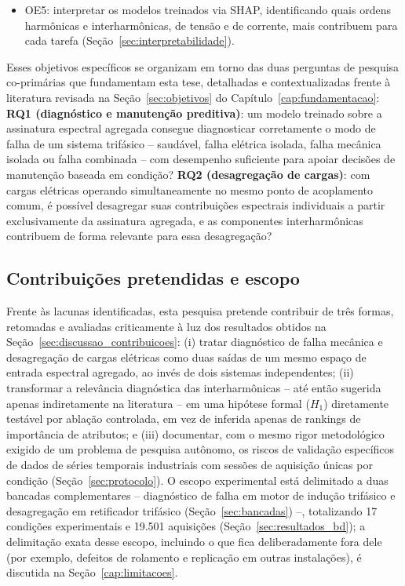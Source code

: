 \documentclass[times,final]{elsarticle}
\begin{document}
{\begin{itemize}
    \item OE5: interpretar os modelos treinados via SHAP, identificando quais ordens harmônicas e interharmônicas, de tensão e de corrente, mais contribuem para cada tarefa (Seção~\ref{sec:interpretabilidade}).
\end{itemize}
Esses objetivos específicos se organizam em torno das duas perguntas de pesquisa co-primárias que fundamentam esta tese, detalhadas e contextualizadas frente à literatura revisada na Seção~\ref{sec:objetivos} do Capítulo~\ref{cap:fundamentacao}:
\textbf{RQ1 (diagnóstico e manutenção preditiva)}: um modelo treinado sobre a assinatura espectral agregada consegue diagnosticar corretamente o modo de falha de um sistema trifásico -- saudável, falha elétrica isolada, falha mecânica isolada ou falha combinada -- com desempenho suficiente para apoiar decisões de manutenção baseada em condição?
\textbf{RQ2 (desagregação de cargas)}: com cargas elétricas operando simultaneamente no mesmo ponto de acoplamento comum, é possível desagregar suas contribuições espectrais individuais a partir exclusivamente da assinatura agregada, e as componentes interharmônicas contribuem de forma relevante para essa desagregação?

\subsection{Contribuições pretendidas e escopo}
Frente às lacunas identificadas, esta pesquisa pretende contribuir de três formas, retomadas e avaliadas criticamente à luz dos resultados obtidos na Seção~\ref{sec:discussao_contribuicoes}: (i) tratar diagnóstico de falha mecânica e desagregação de cargas elétricas como duas saídas de um mesmo espaço de entrada espectral agregado, ao invés de dois sistemas independentes; (ii) transformar a relevância diagnóstica das interharmônicas -- até então sugerida apenas indiretamente na literatura \citep{efe2016} -- em uma hipótese formal ($H_1$) diretamente testável por ablação controlada, em vez de inferida apenas de rankings de importância de atributos; e (iii) documentar, com o mesmo rigor metodológico exigido de um problema de pesquisa autônomo, os riscos de validação específicos de dados de séries temporais industriais com sessões de aquisição únicas por condição (Seção~\ref{sec:protocolo}). O escopo experimental está delimitado a duas bancadas complementares -- diagnóstico de falha em motor de indução trifásico e desagregação em retificador trifásico (Seção~\ref{sec:bancadas}) --, totalizando 17 condições experimentais e 19.501 aquisições (Seção~\ref{sec:resultados_bd}); a delimitação exata desse escopo, incluindo o que fica deliberadamente fora dele (por exemplo, defeitos de rolamento e replicação em outras instalações), é discutida na Seção~\ref{cap:limitacoes}.

}
\end{document}
